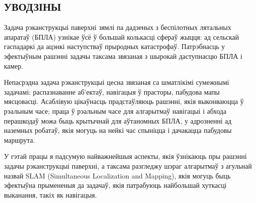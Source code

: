 \begin{center}
    \section*{УВОДЗІНЫ}
\end{center}

Задача рэканструкцыі паверхні зямлі па дадзеных з беспілотных лятальных апаратаў
(БПЛА) узнікае ўсё ў большай колькасці сфераў жыцця: ад сельскай гаспадаркі да
ацэнкі наступстваў прыродных катастрофаў. Патрэбнасць у эфектыўным рашэнні
задачы таксама звязаная з шырокай даступнасцю БПЛА і камер.

Непасрэдна задача рэканструкцыі цесна звязаная са шматлікімі сумежнымі задачамі:
распазнаванне аб'ектаў, навігацыя ў прасторы, пабудова мапы мясцовасці.
Асаблівую цікаўнасць прадстаўляюць рашэнні, якія выконваюцца ў рэальным часе;
праца ў рэальным часе для алгарытмаў навігацыі і абхода перашкодаў можа быць крытычнай для
аўтаномных БПЛА, у адрозненні ад наземных робатаў, якія могуць на нейкі час спыніцца і
дачакацца пабудовы маршрута.

У гэтай працы я падсумую найважнейшыя аспекты, якія ўзнікаюць пры рашэнні задачы
рэканструкцыі паверхні, а таксама разгледжу шэраг алгарытмаў з агульнай назвай
SLAM (Simultaneous Localization and Mapping), якія могуць быць эфектыўна прымененыя
да задачаў, якія патрабуюць найбольшай хуткасці выканання, такіх як навігацыя.

\newpage

